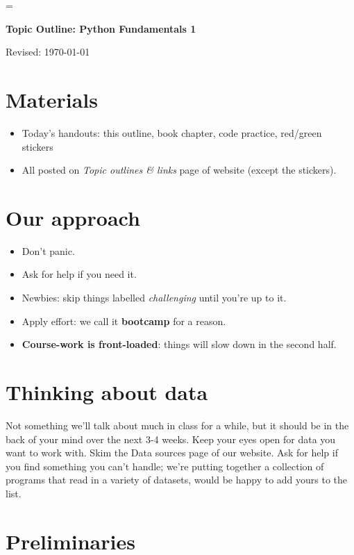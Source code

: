 \documentclass[11pt]{article}
\begin{document}
\parskip=\bigskipamount
\parindent=0.0in
\thispagestyle{empty}


\bigskip\bigskip
\centerline{\Large \bf Topic Outline:  Python Fundamentals 1}
\centerline{Revised: \today}


\section*{Materials}

\begin{itemize}
\item  Today's handouts:  this outline, book chapter, code practice, red/green stickers
\item  All posted on {\it Topic outlines \& links\/} page of website (except the stickers).
\end{itemize}


\section*{Our approach}

\begin{itemize}
\item Don't panic.
\item Ask for help if you need it.
\item Newbies:  skip things labelled {\it challenging\/} until you're up to it.
\item Apply effort: we call it {\bf bootcamp} for a reason.
\item {\bf Course-work is front-loaded}:  things will slow down in the second half.
\end{itemize}


\section*{Thinking about data}

Not something we'll talk about much in class for a while, but it should be in the back of
your mind over the next 3-4 weeks.  Keep your eyes open for data you want to work with.
Skim the Data sources page of our website.
Ask for help if you find something you can't handle; we're putting together
a collection of programs that read in a variety of datasets, would be happy to add yours
to the list.


\section*{Preliminaries}
\end{document}
